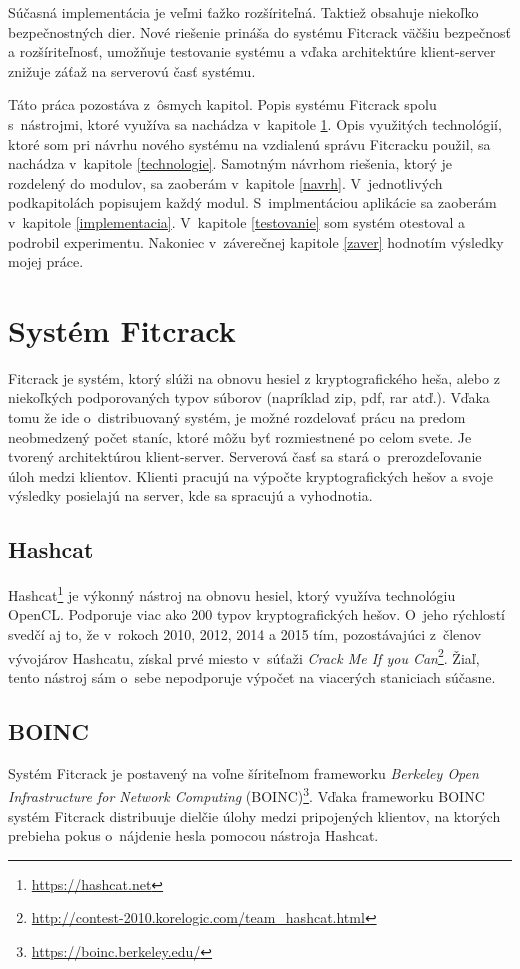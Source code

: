 \documentclass[slovak]{fitthesis}
\begin{document}
Súčasná implementácia je veľmi ťažko rozšíriteľná. Taktiež obsahuje niekoľko bezpečnostných dier. Nové riešenie prináša do systému Fitcrack väčšiu bezpečnosť a rozšíriteľnosť, umožňuje testovanie systému a vďaka architektúre klient-server znižuje záťaž na serverovú časť systému.

Táto práca pozostáva z~ôsmych kapitol. Popis systému Fitcrack spolu s~nástrojmi, ktoré využíva sa nachádza v~kapitole \ref{Fitcrack}. Opis využitých technológií, ktoré som pri návrhu nového systému na vzdialenú správu Fitcracku použil, sa nachádza v~kapitole \ref{technologie}. Samotným návrhom riešenia, ktorý je rozdelený do modulov, sa zaoberám v~kapitole \ref{navrh}. V~jednotlivých podkapitolách popisujem každý modul. S~implmentáciou aplikácie sa zaoberám v~kapitole \ref{implementacia}. V~kapitole \ref{testovanie} som systém otestoval a podrobil experimentu. Nakoniec v~záverečnej kapitole \ref{zaver} hodnotím výsledky mojej práce. 



\chapter{Systém Fitcrack}\label{Fitcrack}
Fitcrack je systém, ktorý slúži na obnovu hesiel z kryptografického heša, alebo z niekoľkých podporovaných typov súborov (napríklad zip, pdf, rar atď.). Vďaka tomu že ide o~distribuovaný systém, je možné rozdelovať prácu na predom neobmedzený počet staníc, ktoré môžu byť rozmiestnené po celom svete. Je tvorený  architektúrou klient-server. Serverová časť sa stará o~prerozdeľovanie úloh medzi klientov. Klienti pracujú na výpočte kryptografických hešov a svoje výsledky posielajú na server, kde sa spracujú a vyhodnotia.
\cite{fitcrackSprava}


\section{Hashcat}\label{hashcat}
Hashcat\footnote{\url{https://hashcat.net}} je výkonný nástroj na obnovu hesiel, ktorý využíva technológiu OpenCL. Podporuje viac ako 200 typov kryptografických hešov. O~jeho rýchlostí svedčí aj to, že v~rokoch 2010, 2012, 2014 a 2015 tím, pozostávajúci z~členov vývojárov Hashcatu, získal prvé miesto v~súťaži \textit{Crack Me If you Can}\footnote{\url{http://contest-2010.korelogic.com/team_hashcat.html}}. Žiaľ, tento nástroj sám o~sebe nepodporuje výpočet na viacerých staniciach súčasne.


\section{BOINC} \label{BOINC}
Systém Fitcrack je postavený na voľne šíriteľnom frameworku \textit{Berkeley Open Infrastructure for Network Computing} (BOINC)\footnote{\url{https://boinc.berkeley.edu/}}. Vďaka frameworku BOINC systém Fitcrack distribuuje dielčie úlohy medzi pripojených klientov, na ktorých prebieha pokus o~nájdenie hesla pomocou nástroja Hashcat.
\end{document}
